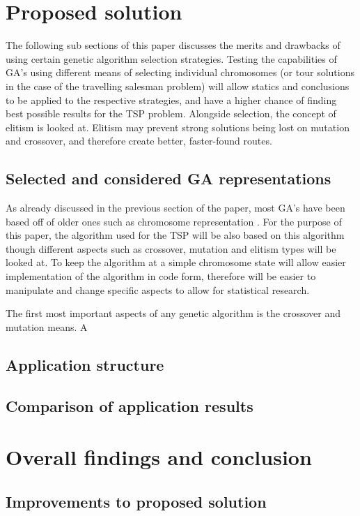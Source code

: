 \documentclass[article]{IEEEtran}
\begin{document}
\section{Proposed solution}
The following sub sections of this paper discusses the merits and drawbacks of using certain genetic algorithm selection strategies. Testing the capabilities of GA's using different means of selecting individual chromosomes (or tour solutions in the case of the travelling salesman problem) will allow statics and conclusions to be applied to the respective strategies, and have a higher chance of finding best possible results for the TSP problem. Alongside selection, the concept of elitism is looked at. Elitism may prevent strong solutions being lost on mutation and crossover, and therefore create better, faster-found routes. 

\subsection{Selected and considered GA representations}
As already discussed in the previous section of the paper, most GA's have been based off of older ones such as chromosome representation \cite{5}. For the purpose of this paper, the algorithm used for the TSP will be also based on this algorithm though different aspects such as crossover, mutation and elitism types will be looked at. To keep the algorithm at a simple chromosome state will allow easier implementation of the algorithm in code form, therefore will be easier to manipulate and change specific aspects to allow for statistical research. \par
The first most important aspects of any genetic algorithm is the crossover and mutation means. A

\subsection{Application structure}

\subsection{Comparison of application results}

\section{Overall findings and conclusion}

\subsection{Improvements to proposed solution}
\end{document}

